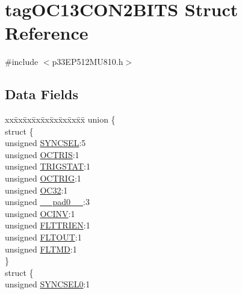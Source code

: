\hypertarget{structtag_o_c13_c_o_n2_b_i_t_s}{}\section{tag\+O\+C13\+C\+O\+N2\+B\+I\+TS Struct Reference}
\label{structtag_o_c13_c_o_n2_b_i_t_s}


{\ttfamily \#include $<$p33\+E\+P512\+M\+U810.\+h$>$}

\subsection*{Data Fields}
\begin{DoxyCompactItemize}
\item 
\begin{tabbing}
xx\=xx\=xx\=xx\=xx\=xx\=xx\=xx\=xx\=\kill
union \{\\
\>struct \{\\
\>\>unsigned \hyperlink{structtag_o_c13_c_o_n2_b_i_t_s_a35fbbe11485c2615ed27535b62c3fa35}{SYNCSEL}:5\\
\>\>unsigned \hyperlink{structtag_o_c13_c_o_n2_b_i_t_s_ab849a74c6179282ed6b06cc047c80544}{OCTRIS}:1\\
\>\>unsigned \hyperlink{structtag_o_c13_c_o_n2_b_i_t_s_ab379549de54ac93ad4aa73686c34cb7c}{TRIGSTAT}:1\\
\>\>unsigned \hyperlink{structtag_o_c13_c_o_n2_b_i_t_s_a8d2cf9b996ef2b9079defa8950de798c}{OCTRIG}:1\\
\>\>unsigned \hyperlink{structtag_o_c13_c_o_n2_b_i_t_s_af52e127483a703e0fa84c7d4f1de0df4}{OC32}:1\\
\>\>unsigned \hyperlink{structtag_o_c13_c_o_n2_b_i_t_s_adf71f3d8410c1f1dbbc96680a92c49af}{\_\_pad0\_\_}:3\\
\>\>unsigned \hyperlink{structtag_o_c13_c_o_n2_b_i_t_s_a301004fca40c8d19d418866c92c19a06}{OCINV}:1\\
\>\>unsigned \hyperlink{structtag_o_c13_c_o_n2_b_i_t_s_ab979b75e02643aa840fb6ee50e0c30fa}{FLTTRIEN}:1\\
\>\>unsigned \hyperlink{structtag_o_c13_c_o_n2_b_i_t_s_ae466664b094d9c830e9ce20b86d7907f}{FLTOUT}:1\\
\>\>unsigned \hyperlink{structtag_o_c13_c_o_n2_b_i_t_s_a245ca3019d6c6ccbfb09f1c821146bb5}{FLTMD}:1\\
\>\} \\
\>struct \{\\
\>\>unsigned \hyperlink{structtag_o_c13_c_o_n2_b_i_t_s_a3b5df3154fde5141e6ac0156425ff8b4}{SYNCSEL0}:1\\

\end{tabbing}
\end{DoxyCompactItemize}
